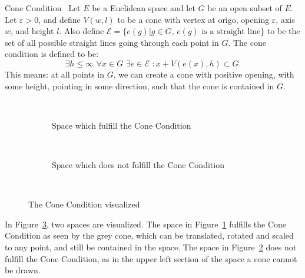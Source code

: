 \begin{defn}{Cone Condition}~\label{def:cone_condition}
    Let $E$ be a Euclidean space and let $G$ be an open subset of $E$.
    Let $\varepsilon >0$, and define 
    $V(w, l)$ to be a cone with vertex at origo, opening $\varepsilon$, axis $w$,
    and height $l$.
    Also define $\mathcal{E} = \{e(g) | g \in G, \, e(g) \text{ is a straight line}\}$ 
    to be the set of all possible straight lines going through each point in $G$. %
    The cone condition is defined to be: %
    \begin{equation*}
        \exists h \leq \infty \,\,
        \forall x \in G\,\, \exists e\in \mathcal{E} \,\, :
        x + V(e(x), h) \subset G. %
    \end{equation*}
    This means: at all points in $G$, we can create a cone with positive opening,
    with some height, pointing in some direction, such that the cone is contained 
    in $G$.
\end{defn}
\begin{figure}[H]
    \centering
    \begin{subfigure}{.3\textwidth}
        \centering
        
        \caption{Space which fulfill the Cone Condition}~\label{fig:cone_condition_true}
      \end{subfigure}
    \begin{subfigure}{.3\textwidth}
        \centering
        
        \caption{Space which does not fulfill the Cone Condition}~\label{fig:cone_condition_false}
      \end{subfigure}
      \caption{The Cone Condition visualized}~\label{fig:cone_condition_visu}
\end{figure}
In Figure~\ref{fig:cone_condition_visu}, two spaces are visualized.
 The space in Figure~\ref{fig:cone_condition_true} fulfills the Cone Condition as seen 
 by the grey cone, which can be translated, rotated and scaled to any point, and still 
 be contained in the space. The space  
 in Figure~\ref{fig:cone_condition_false} does not fulfill the Cone Condition, as
in the upper left section of the space a cone cannot be drawn.

